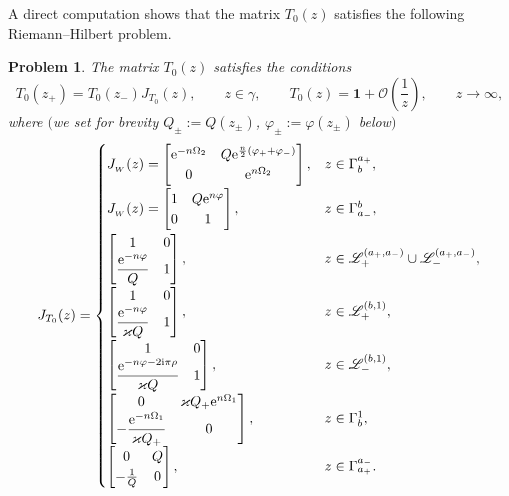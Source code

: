 \documentclass[pdftex]{sigma}
\numberwithin{equation}{section}
\newtheorem{problem}[Theorem]{Problem}
\theoremstyle{definition}
\def \scr{\mathscr}
\def\le{\left}
\def\ri{\right}
\def \1{\mathbf 1}
\begin{document}
A direct computation shows that the matrix $T_0(z)$ satisfies the following Riemann--Hilbert problem.

\begin{problem}\label{RHPT0g1s<0}
The matrix $T_0(z)$ satisfies the conditions
\[
T_0(z_+)= T_0(z_-) J_{T_0}(z), \qquad z\in \gamma,\qquad
T_0(z) = \1 + \mathcal O\le(\frac 1 z \ri), \qquad z\to \infty,
\]
where $($we set for brevity $Q_\pm:= Q(z_\pm)$, $\varphi_\pm := \varphi(z_\pm)$ below$)$
\[
J_{T_0}(z) =
\begin{cases}
J_{_W}(z) =
 \begin{bmatrix}
{\rm e}^{-n\Omega_2} & Q{\rm e}^{\frac n2 (\varphi_++\varphi_-)} \\
0 & {\rm e}^{n\Omega_2}
\end{bmatrix},
 & z\in \Gamma_{b}^{a_+},\\[10pt]
 J_{_W}(z) =
 \begin{bmatrix}
1 & Q{\rm e}^{n \varphi } \\
0 &1
\end{bmatrix},
 & z\in \Gamma^{b}_{a_-},\\[10pt]
 \begin{bmatrix}
1 & 0 \\
\displaystyle\frac{ {\rm e}^{-n\varphi} }{ Q} & 1
\end{bmatrix},
& z\in \scr L_+^{(a_+,a_-)}\cup \scr L_-^{(a_+,a_-)},
\\[10pt]
 \begin{bmatrix}
1 & 0 \\
\displaystyle \frac{ {\rm e}^{-n\varphi} }{\varkappa Q} & 1
\end{bmatrix},
& z\in \scr L_+^{(b,1)},
\\[10pt]
\begin{bmatrix}
1 & 0 \\
\displaystyle \frac{ {\rm e}^{-n\varphi-2{\rm i}\pi { {\rho}}} }{\varkappa Q} & 1
\end{bmatrix},
& z\in \scr L_-^{(b,1)},
\\[10pt]
\begin{bmatrix}
 0 & \varkappa Q_+ {\rm e}^{n\Omega_1}\\
\displaystyle -\frac {{\rm e}^{-n\Omega_1}} {\varkappa Q_+} & 0
\end{bmatrix},
 & z\in \Gamma_b^1,
\\[10pt]
\begin{bmatrix}
 0 & Q \\
 -\frac {1} { Q} & 0
\end{bmatrix},
 & z\in \Gamma_{a_+}^{a_-}.
\end{cases}\]
\end{problem}
\end{document}

